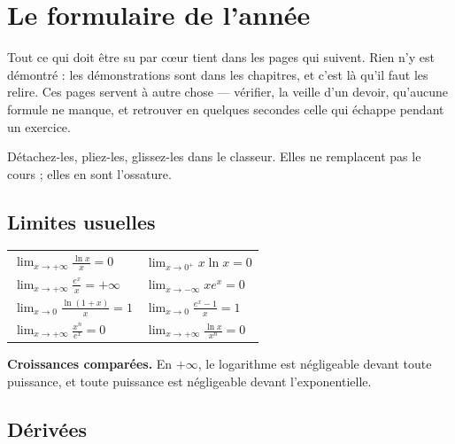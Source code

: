 \chapter{Le formulaire de l'année}

Tout ce qui doit être su par cœur tient dans les pages qui suivent. Rien n'y
est démontré : les démonstrations sont dans les chapitres, et c'est là qu'il
faut les relire. Ces pages servent à autre chose — vérifier, la veille d'un
devoir, qu'aucune formule ne manque, et retrouver en quelques secondes celle
qui échappe pendant un exercice.

Détachez-les, pliez-les, glissez-les dans le classeur. Elles ne remplacent pas
le cours ; elles en sont l'ossature.

\section*{Limites usuelles}

\begin{center}
\setlength{\tabcolsep}{10pt}
\renewcommand{\arraystretch}{1.6}
\begin{tabular}{@{}ll@{}}
\toprule
$\displaystyle\lim_{x\to+\infty}\frac{\ln x}{x} = 0$ &
$\displaystyle\lim_{x\to0^{+}}x\ln x = 0$ \\
$\displaystyle\lim_{x\to+\infty}\frac{e^{x}}{x} = +\infty$ &
$\displaystyle\lim_{x\to-\infty}xe^{x} = 0$ \\
$\displaystyle\lim_{x\to0}\frac{\ln(1+x)}{x} = 1$ &
$\displaystyle\lim_{x\to0}\frac{e^{x}-1}{x} = 1$ \\
$\displaystyle\lim_{x\to+\infty}\frac{x^{n}}{e^{x}} = 0$ &
$\displaystyle\lim_{x\to+\infty}\frac{\ln x}{x^{n}} = 0$ \\
\bottomrule
\end{tabular}
\end{center}

\noindent
\textbf{Croissances comparées.} En $+\infty$, le logarithme est négligeable
devant toute puissance, et toute puissance est négligeable devant
l'exponentielle.

\section*{Dérivées}

